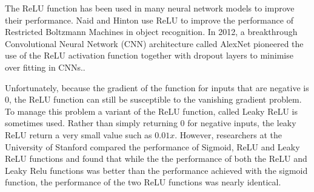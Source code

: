 The ReLU function has been used in many neural network models to improve their performance. Naid and Hinton use ReLU to improve the performance of Restricted Boltzmann Machines in object recognition\cite{Nair2010}. In 2012, a breakthrough Convolutional Neural Network (CNN) architecture called AlexNet pioneered the use of the ReLU activation function together with dropout layers to minimise over fitting in CNNs.\cite{KrizhevskyAlex2017Icwd}. 

Unfortunately, because the gradient of the function for inputs that are negative is $0$, the ReLU function can still be susceptible to the vanishing gradient problem. To manage this problem a variant of the ReLU function, called Leaky ReLU is sometimes used. Rather than simply returning 0 for negative inputs, the leaky ReLU return a very small value such as $0.01x$. However, researchers at the University of Stanford compared the performance of Sigmoid, ReLU and Leaky ReLU functions and found that while the the performance of both the ReLU and Leaky Relu functions was better than the performance achieved with the sigmoid function, the performance of the two ReLU functions was nearly identical\cite{maas2013rectifier}.
